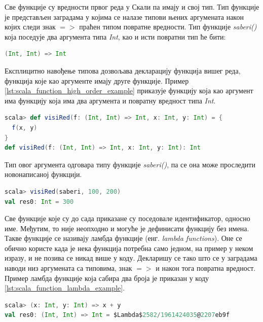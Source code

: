 \documentclass[12pt,oneside]{memoir}
\begin{document}
Све функције су вредности првог реда у Скали па имају и свој тип. Тип функције је представљен заградама у којима се налазе типови њених аргумената након којих следи знак $=>$ праћен типом повратне вредности. Тип функције \textit{saberi()} која поседује два аргумента типа \textit{Int}, као и исти повратни тип ће бити:

\begin{lstlisting}[language=Scala, caption={Тип функције \textit{saberi()}}, label={lst:scala_function_add_example_type}]
(Int, Int) => Int
\end{lstlisting}

Експлицитно навођење типова дозвољава декларацију функција вишег реда, функција које као аргументе имају друге функције. Пример \ref{lst:scala_function_high_order_example} приказује функцију која као аргумент има функцију која има два аргумента и повратну вредност типа \textit{Int}.

\begin{lstlisting}[language=Scala, caption={Функција вишег реда}, label={lst:scala_function_high_order_example}]
scala> def visiRed(f: (Int, Int) => Int, x: Int, y: Int) = {
  f(x, y)
}
def visiRed(f: (Int, Int) => Int, x: Int, y: Int): Int
\end{lstlisting}

Тип овог аргумента одговара типу функције \textit{saberi()}, па се она може проследити новонаписаној функцији.

\begin{lstlisting}[language=Scala, caption={Прослеђивање функције функцији}, label={lst:scala_function_add_high_order}]
scala> visiRed(saberi, 100, 200)
val res0: Int = 300
\end{lstlisting}

Све функције које су до сада приказане су поседовале идентификатор, односно име. Међутим, то није неопходно и могуће је дефинисати функцију без имена. Такве функције се називају ламбда функције (енг. \textit{lambda functions}). Оне се обично користе када је нека функција потребна само једном, на пример у неком изразу, и не позива се никад више у коду. Декларишу се тако што се у заградама наводи низ аргумената са типовима, знак $=>$ и након тога повратна вредност. Пример ламбда функције која сабира два броја је приказан у коду \ref{lst:scala_function_lambda_example}.

\begin{lstlisting}[language=Scala, caption={Пример ламбда функције}, label={lst:scala_function_lambda_example}]
scala> (x: Int, y: Int) => x + y
val res0: (Int, Int) => Int = $Lambda$2582/1961424035@2207eb9f
\end{lstlisting}
\end{document}
